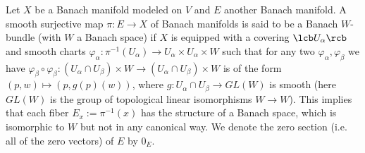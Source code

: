 Let $X$ be a Banach manifold modeled on $V$ and $E$ another Banach manifold. A smooth surjective map $\pi : E \rightarrow X$ of Banach manifolds is said to be a Banach $W$-bundle (with $W$ a Banach space) if $X$ is equipped with a covering $\lcb U_\alpha \rcb$ and smooth charts $\varphi_\alpha : \pi^{-1}(U_\alpha) \rightarrow U_\alpha \times U_\alpha \times W$ such that for any two $\varphi_\alpha,\varphi_\beta$ we have $\varphi_\beta \circ \varphi_\beta : (U_\alpha \cap U_\beta) \times W \rightarrow (U_\alpha \cap U_\beta) \times W$ is of the form $(p,w) \mapsto (p,g(p)(w))$, where $g : U_\alpha \cap U_\beta \rightarrow GL(W)$ is smooth (here $GL(W)$ is the group of topological linear isomorphisms $W \rightarrow W$). This implies that each fiber $E_x := \pi^{-1}(x)$ has the structure of a Banach space, which is isomorphic to $W$ but not in any canonical way. We denote the zero section (i.e. all of the zero vectors) of $E$ by $0_E$.

